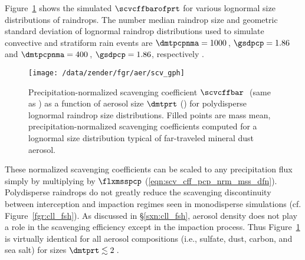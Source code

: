 \documentclass[12pt,twoside]{book}
\begin{document}
Figure~\ref{fgr:scv_cff_mss_nrm} shows the simulated $\scvcffbarofprt$ 
for various lognormal size distributions of raindrops.
The number median raindrop size and geometric standard deviation of 
lognormal raindrop distributions used to simulate convective and
stratiform rain events are $\dmtpcpnma = 1000$\,\um, $\gsdpcp = 1.86$
and $\dmtpcpnma = 400$\,\um, $\gsdpcp = 1.86$, respectively
\cite[]{NGD94}. 
\begin{figure*}
\begin{center}
\texttt{[image: /data/zender/fgr/aer/scv\_gph]}\vfill
\end{center}
\caption[Scavenging coefficient for polydisperse raindrops]{
Precipitation-normalized scavenging coefficient 
$\scvcffbar$\,\xmm\ (same as \mSxkg) as a function of
aerosol size $\dmtprt$ (\um) for polydisperse lognormal raindrop size  
distributions.  
Filled points are mass mean, precipitation-normalized scavenging
coefficients computed for a lognormal size distribution typical of
far-traveled mineral dust aerosol.
\label{fgr:scv_cff_mss_nrm}}
\end{figure*}
These normalized scavenging coefficients can be scaled to any
precipitation flux simply by multiplying by $\flxmsspcp$
(\ref{eqn:scv_cff_pcp_nrm_mss_dfn}). 
Polydisperse raindrops do not greatly reduce the scavenging
discontinuity between interception and impaction regimes seen in
monodisperse simulations (cf. Figure~\ref{fgr:cll_fsh}).
As discussed in \S\ref{sxn:cll_fsh}, aerosol density does not play 
a role in the scavenging efficiency except in the impaction process. 
Thus Figure~\ref{fgr:scv_cff_mss_nrm} is virtually identical for all
aerosol compositions (i.e., sulfate, dust, carbon, and sea salt) for
sizes $\dmtprt \lesssim 2$\,\um.  
\end{document}
